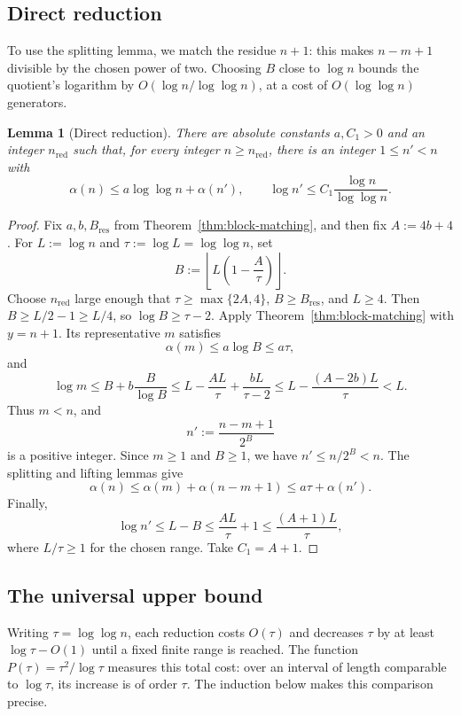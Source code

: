 \documentclass[11pt]{article}
\newtheorem{lemma}[lemma]{Lemma}
\theoremstyle{definition}
\theoremstyle{remark}
\begin{document}
\subsection{Direct reduction}

To use the splitting lemma, we match the residue $n+1$: this makes
$n-m+1$ divisible by the chosen power of two.  Choosing $B$ close to
$\log n$ bounds the quotient's logarithm by
$O(\log n/\log\log n)$, at a cost of $O(\log\log n)$ generators.

\begin{lemma}[Direct reduction]\label{lem:direct-reduction}
There are absolute constants $a,C_1>0$ and an integer $n_{\mathrm{red}}$ such that,
for every integer $n\ge n_{\mathrm{red}}$, there is an integer $1\le n'<n$ with
\[
  \alpha(n)\le a\log\log n+\alpha(n'),
  \qquad
  \log n'\le C_1\frac{\log n}{\log\log n}.
\]
\end{lemma}

\begin{proof}
Fix $a,b,B_{\mathrm{res}}$ from Theorem~\ref{thm:block-matching}, and then fix
$A:=4b+4$.  For $L:=\log n$ and $\tau:=\log L=\log\log n$, set
\[
  B:=\left\lfloor L\left(1-\frac{A}{\tau}\right)\right\rfloor.
\]
Choose $n_{\mathrm{red}}$ large enough that $\tau\ge\max\{2A,4\}$,
$B\ge B_{\mathrm{res}}$, and $L\ge4$.  Then
$B\ge L/2-1\ge L/4$, so $\log B\ge \tau-2$.  Apply
Theorem~\ref{thm:block-matching} with $y=n+1$.  Its representative $m$
satisfies
\[
  \alpha(m)\le a\log B\le a\tau,
\]
and
\[
  \log m
  \le B+b\frac{B}{\log B}
  \le L-\frac{AL}{\tau}+\frac{bL}{\tau-2}
  \le L-\frac{(A-2b)L}{\tau}<L.
\]
Thus $m<n$, and
\[
  n':=\frac{n-m+1}{2^B}
\]
is a positive integer.  Since $m\ge1$ and $B\ge1$, we have
$n'\le n/2^B<n$.  The splitting and lifting lemmas give
\[
  \alpha(n)
  \le\alpha(m)+\alpha(n-m+1)
  \le a\tau+\alpha(n').
\]
Finally,
\[
  \log n'\le L-B\le\frac{AL}{\tau}+1
  \le\frac{(A+1)L}{\tau},
\]
where $L/\tau\ge1$ for the chosen range.  Take $C_1=A+1$.
\end{proof}

\subsection{The universal upper bound}

Writing $\tau=\log\log n$, each reduction costs $O(\tau)$ and decreases $\tau$ by
at least $\log \tau-O(1)$ until a fixed finite range is reached.  The function
$P(\tau)=\tau^2/\log \tau$ measures this total cost: over an interval of length
comparable to $\log \tau$, its increase is of order $\tau$.  The induction below
makes this comparison precise.
\end{document}
